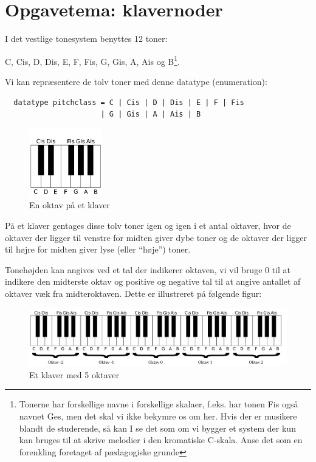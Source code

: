 \documentclass[a4paper,12pt]{article}
\begin{document}
\newpage
\section{Opgavetema: klavernoder}
I det vestlige tonesystem benyttes 12 toner:

\quad C, Cis, D, Dis, E, F, Fis, G, Gis, A, Ais og B\footnote{Tonerne
  har forskellige navne i forskellige skalaer, f.eks. har tonen Fis
  også navnet Ges, men det skal vi ikke bekymre os om her. Hvis der er
  musikere blandt de studerende, så kan I se det som om vi bygger et
  system der kun kan bruges til at skrive melodier i den kromatiske
  C-skala. Anse det som en forenkling foretaget af
  pædagogiske grunde}.

Vi kan repræsentere de tolv toner med denne datatype (enumeration):
\begin{lstlisting}
  datatype pitchclass = C | Cis | D | Dis | E | F | Fis
                      | G | Gis | A | Ais | B
\end{lstlisting}
\vspace{-8mm}
\begin{figure}[h!]
  \centering
  \includegraphics[height=8em]{uge4_oktav.pdf}
  \caption{En oktav på et klaver}
  \label{fig:oktav}
\end{figure}

På et klaver gentages disse tolv toner igen og igen i et antal
oktaver, hvor de oktaver der ligger til venstre for midten giver dybe
toner og de oktaver der ligger til højre for midten giver lyse (eller
"`høje"') toner.

Tonehøjden kan angives ved et tal der indikerer oktaven, vi vil bruge
0 til at indikere den midterste oktav og positive og negative tal til
at angive antallet af oktaver væk fra midteroktaven. Dette er
illustreret på følgende figur:
\begin{figure}[h!]
  \centering
  \includegraphics[width=\textwidth]{uge4_5oktaver.pdf}
  \caption{Et klaver med 5 oktaver}
  \label{fig:oktav}
\end{figure}
\end{document}
